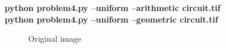 \begin{minipage}{\textwidth}
\textbf{python problem4.py --uniform --arithmetic circuit.tif} \\
\textbf{python problem4.py --uniform --geometric circuit.tif} \\
\end{minipage}

\begin{figure}[!htb]\centering
    \begin{minipage}{0.45\textwidth}
        \caption{\small{Original image}}
    \end{minipage}
    \begin{minipage}{0.45\textwidth}

\end{minipage}
\end{figure}
